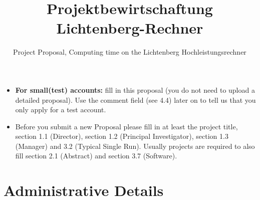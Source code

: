 \documentclass[accentcolor=tud9c,nochapname,11pt]{tudexercise}
\begin{document}
\title{Projektbewirtschaftung \\ Lichtenberg-Rechner}
\subtitle{Project Proposal, Computing time on the Lichtenberg Hochleistungsrechner}
\maketitle

\begin{itemize}
	\item \textbf{For small(test) accounts:} fill in this proposal (you do not need to upload a detailed proposal). Use the comment field (see 4.4) later on to tell us that you only apply for a test account.
	\item Before you submit a new Proposal please fill in at least the project title, section 1.1 (Director), section 1.2 (Principal Investigator), section 1.3 (Manager) and 3.2 (Typical Single Run). Usually projects are required to also fill section 2.1 (Abstract) and section 3.7 (Software).
\end{itemize}

\section{Administrative Details}
\end{document}
